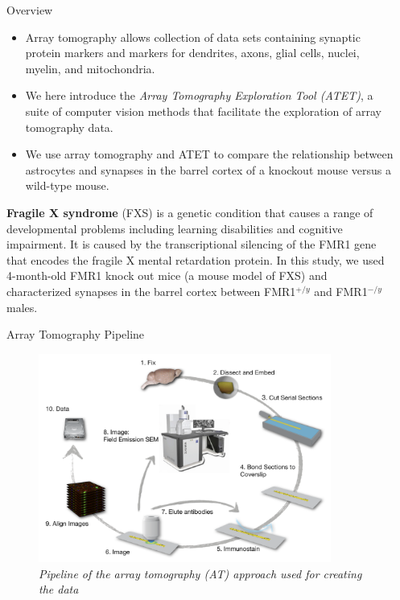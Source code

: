 \documentclass[final, table]{beamer}
\newlength{\sepwid}
\newlength{\onecolwid}
\begin{document}
\begin{frame}[t]  
\begin{columns}[t]  %

\begin{column}{\sepwid}\end{column}  %
\begin{column}{\onecolwid} 

\begin{block}{Overview} 

\begin{itemize}

\item Array tomography allows collection of data sets containing synaptic protein markers and markers for dendrites, axons, glial cells, nuclei, myelin, and mitochondria.

\item We here introduce the {\it Array Tomography Exploration Tool (ATET)}, a suite of computer vision methods that facilitate the exploration of array tomography data. 

\item We use array tomography and ATET to compare the relationship between astrocytes and synapses in the barrel cortex of a knockout mouse versus a wild-type mouse. 

\end{itemize}

\textbf{Fragile X syndrome} (FXS) is a genetic condition that causes a range of developmental problems including learning disabilities and cognitive impairment.  It is caused by the transcriptional silencing of the FMR1 gene that encodes the fragile X mental retardation protein. In this study, we used 4-month-old FMR1 knock out mice (a mouse model of FXS) and characterized synapses in the barrel cortex between FMR1$^{+/y}$ and FMR1$^{-/y}$ males.


\end{block}

\begin{block}{Array Tomography Pipeline} 

\begin{figure}
\centering
\includegraphics[width=0.9\textwidth]{figs/atpipeline}
\caption{\textit{Pipeline of the array tomography (AT) approach used for creating the data}}
\end{figure}


\end{block}
\end{column}
\end{columns}
\end{frame}
\end{document}
